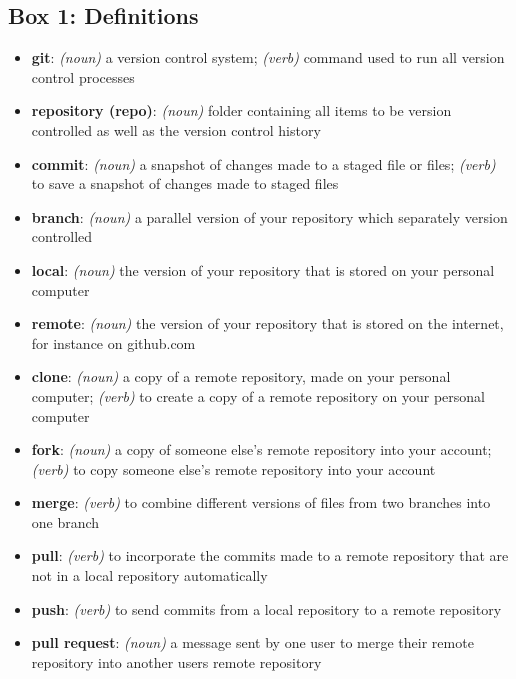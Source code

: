 \subsection{Box 1: Definitions}

\begin{itemize}
\item \textbf{git}: \textit{(noun)} a version control system; \textit{(verb)} command used to run all version control processes
\item \textbf{repository (repo)}: \textit{(noun)} folder containing all items to be version controlled as well as the version control history
\item \textbf{commit}: \textit{(noun)} a snapshot of changes made to a staged file or files; \textit{(verb)} to save a snapshot of changes made to staged files 
\item \textbf{branch}: \textit{(noun)} a parallel version of your repository which separately version controlled
\item \textbf{local}: \textit{(noun)} the version of your repository that is stored on your personal computer
\item \textbf{remote}: \textit{(noun)} the version of your repository that is stored on the internet, for instance on github.com
\item \textbf{clone}: \textit{(noun)} a copy of a remote repository, made on your personal computer; \textit{(verb)} to create a copy of a remote repository on your personal computer
\item \textbf{fork}: \textit{(noun)} a copy of someone else's remote repository into your account; \textit{(verb)} to copy someone else's remote repository into your account
\item \textbf{merge}: \textit{(verb)} to combine different versions of files from two branches into one branch
\item \textbf{pull}: \textit{(verb)} to incorporate the commits made to a remote repository that are not in a local repository automatically
\item \textbf{push}: \textit{(verb)} to send commits from a local repository to a remote repository
\item \textbf{pull request}: \textit{(noun)} a message sent by one user to merge their remote repository into another users remote repository
\end{itemize}